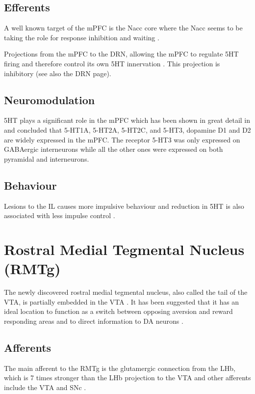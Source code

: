 \documentclass[12pt,a4paper]{article}
\let\oldsection\section
\renewcommand\section{\clearpage\oldsection}
\begin{document}
\subsection{Efferents}

A well known target of the mPFC is the Nacc core where the Nacc seems to be taking the role for response inhibition and waiting \citep{Neufang2016} \citep{Feja2014}.

Projections from the mPFC to the DRN, allowing the mPFC to regulate 5HT firing and therefore control its own 5HT innervation  \citep{Homberg2012}\citep{Juckel1999}. This projection is inhibitory (see also the DRN page).

\subsection{Neuromodulation}

5HT plays a significant role in the mPFC which has been shown in great detail in \citep{Santana2017} and concluded that 5-HT1A, 5-HT2A, 5-HT2C, and 5-HT3, 
dopamine D1 and D2 are widely expressed in the mPFC. The receptor 5-HT3 was only expressed on GABAergic interneurons while all the other ones were expressed on both pyramidal and interneurons.


\subsection{Behaviour}
Lesions to the IL causes more impulsive behaviour \citep{Tsutsui-Kimura2016} and reduction in 5HT is also associated with less impulse control \citep{Neufang2016}.



\section{Rostral Medial Tegmental Nucleus (RMTg) }

The newly discovered rostral medial tegmental nucleus, also called the tail of
the VTA, is partially embedded in the VTA \citep{Bourdy2012}. It has been suggested that it has
an ideal location to function as a switch between opposing aversion and reward
responding areas and to direct information to DA neurons \citep{Barrot2012}.

\subsection{Afferents}

The main afferent to the RMTg is the glutamergic connection from the LHb, which is 7 times
stronger than the LHb projection to the VTA \citep{Barrot2012} and other afferents include
the VTA and SNc \citep{Lavezzi2011}.
\end{document}
